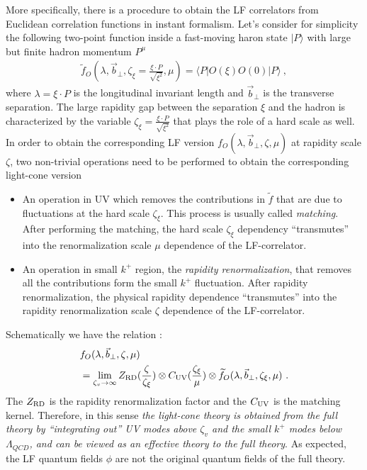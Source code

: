 \documentclass[twocolumn,superscriptaddress,longbibliography,10pt]{revtex4-1}
\begin{document}
More specifically, there is a procedure to obtain the LF correlators from Euclidean correlation functions in instant formalism.  Let's consider for simplicity the following two-point function inside a fast-moving haron state $|P\rangle$ with large but finite hadron momentum $P^{\mu}$
\begin{align}
 \widetilde f_{O} (\lambda,\vec{b}_\perp, \zeta_\xi=\frac{\xi \cdot P }{\sqrt{\xi^2}},\mu)=\langle P|O(\xi)O(0)|P \rangle  \ ,
\end{align}
where $\lambda=\xi\cdot P$ is the longitudinal invariant length and $\vec{b}_\perp$ is the transverse separation. The large rapidity gap between the separation $\xi$ and the hadron is characterized by the variable $\zeta_\xi=\frac{\xi \cdot P }{\sqrt{\xi^2}}$ that plays the role of a hard scale as well. In order to obtain the corresponding LF version $f_{O}(\lambda, \vec{b}_\perp,\zeta,\mu)$ at rapidity scale $\zeta$, two non-trivial operations need to be performed to obtain the corresponding light-cone version \begin{itemize}
\item An operation in UV which removes the contributions in $\widetilde f$ that are due to fluctuations at the hard scale $\zeta_\xi$. This process is usually called {\it matching}. After performing the matching, the hard scale $\zeta_\xi$  dependency ``transmutes'' into the renormalization scale $\mu$ dependence of the LF-correlator.
\item An operation in small $k^+$ region, the {\it rapidity renormalization}, that removes all the contributions form the small $k^+$ fluctuation.  After rapidity renormalization, the physical rapidity dependence ``transmutes'' into the rapidity renormalization scale $\zeta$ dependence of the LF-correlator.
\end{itemize}
Schematically we have the relation :
\begin{align}
&f_O(\lambda,\vec{b}_\perp, \zeta,\mu)\nonumber \\
&=\lim_{\zeta_v \rightarrow \infty} Z_{\rm RD}(\frac{\zeta}{\zeta_\xi})\otimes C_{\rm UV}(\frac{\zeta_\xi}{\mu})\otimes \widetilde f_O(\lambda,\vec{b}_\perp,\zeta_\xi,\mu) \ .
\end{align}
The $Z_{\rm RD}$ is the rapidity renormalization factor and the $C_{\rm UV}$ is the matching kernel. Therefore, in this sense {\it the light-cone theory is obtained from the full theory by ``integrating out'' UV modes above $\zeta_v$ and the small $k^+$ modes below $\Lambda_{QCD}$, and can be viewed as an effective theory to the full theory}.  As expected, the LF quantum fields $\phi$ are not the original quantum fields of the full theory.
\end{document}
